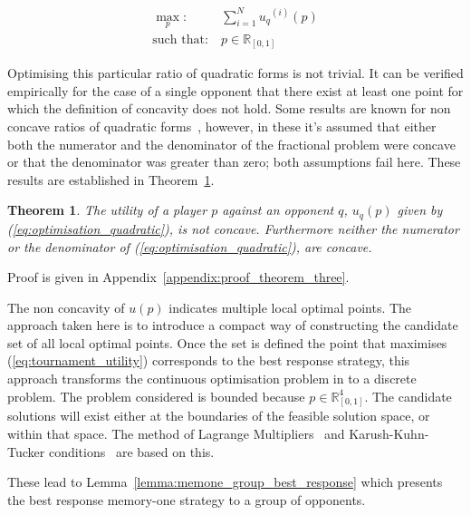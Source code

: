 \documentclass[10pt]{article}
\newcommand{\R}{\mathbb{R}}
\newtheorem{theorem}{Theorem}
\begin{document}
\begin{equation}\label{eq:mo_tournament_optimisation}
    \begin{aligned}
    \max_p: & \ \sum_{i=1} ^ {N} {u_q}^{(i)} (p)
    \\
    \text{such that}: & \ p \in \R_{[0, 1]}
    \end{aligned}
\end{equation}

Optimising this particular ratio of quadratic forms is not trivial. It can be
verified empirically for the case of a single opponent that there exist at least
one point for which the definition of concavity does not hold. Some results are
known for non concave ratios of quadratic forms~\cite{Beck2009, Hongyan2014},
however, in these it's assumed that either both the numerator and the
denominator of the fractional problem were concave or that the denominator was
greater than zero; both assumptions fail here. These results are established in
Theorem~\ref{theorem:concavity}.

\begin{theorem}\label{theorem:concavity}
    The utility of a player \(p\) against an opponent \(q\), \(u_q (p)\) given
    by (\ref{eq:optimisation_quadratic}), is not concave. Furthermore neither
    the numerator or the denominator of (\ref{eq:optimisation_quadratic}), are
    concave.
\end{theorem}

Proof is given in Appendix~\ref{appendix:proof_theorem_three}.

The non concavity of \(u(p)\) indicates multiple local optimal points. The
approach taken here is to introduce a compact way of constructing the candidate
set of all local optimal points. Once the set is defined the point that
maximises (\ref{eq:tournament_utility}) corresponds to the best response
strategy, this approach transforms the continuous optimisation problem in to a
discrete problem. The problem considered is bounded because \(p \in \R^4_{[0,
1]}\). The candidate solutions will exist either at the boundaries of the
feasible solution space, or within that space. The method of Lagrange
Multipliers~\cite{bertsekas2014} and Karush-Kuhn-Tucker
conditions~\cite{Giorgi2016} are based on this.

These lead to Lemma~\ref{lemma:memone_group_best_response} which
presents the best response memory-one strategy to a group of opponents.
\end{document}
